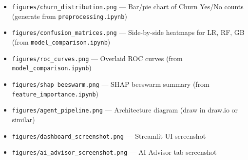 \documentclass[conference]{IEEEtran}
\begin{document}
\begin{itemize}
  \item \texttt{figures/churn\_distribution.png} — Bar/pie chart of
        Churn Yes/No counts (generate from \texttt{preprocessing.ipynb})
  \item \texttt{figures/confusion\_matrices.png} — Side-by-side
        heatmaps for LR, RF, GB (from \texttt{model\_comparison.ipynb})
  \item \texttt{figures/roc\_curves.png} — Overlaid ROC curves
        (from \texttt{model\_comparison.ipynb})
  \item \texttt{figures/shap\_beeswarm.png} — SHAP beeswarm summary
        (from \texttt{feature\_importance.ipynb})
  \item \texttt{figures/agent\_pipeline.png} — Architecture diagram
        (draw in draw.io or similar)
  \item \texttt{figures/dashboard\_screenshot.png} — Streamlit UI
        screenshot
  \item \texttt{figures/ai\_advisor\_screenshot.png} — AI Advisor tab
        screenshot
\end{itemize}
\end{document}
